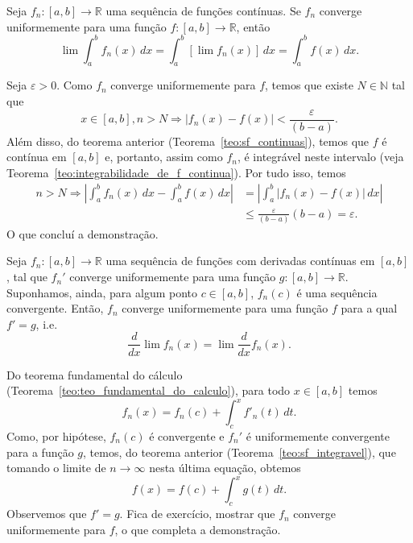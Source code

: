 \begin{teo}\label{teo:sf_integravel}
  Seja $f_n:[a, b]\to\mathbb{R}$ uma sequência de funções contínuas. Se $f_n$ converge uniformemente para uma função $f:[a, b]\to\mathbb{R}$, então
  \begin{equation}
    \lim \int_a^b f_n(x)\,dx = \int_a^b [\lim f_n(x)]\,dx = \int_a^b f(x)\,dx.
  \end{equation}
\end{teo}
\begin{dem}
  Seja $\varepsilon>0$. Como $f_n$ converge uniformemente para $f$, temos que existe $N\in\mathbb{N}$ tal que
  \begin{equation}
    x\in [a, b], n>N \Rightarrow |f_n(x) - f(x)| < \frac{\varepsilon}{(b-a)}.
  \end{equation}
Além disso, do teorema anterior (Teorema~\ref{teo:sf_continuas}), temos que $f$ é contínua em $[a, b]$ e, portanto, assim como $f_n$, é integrável neste intervalo (veja Teorema~\ref{teo:integrabilidade_de_f_continua}). Por tudo isso, temos
\begin{align}
  n>N \Rightarrow \left|\int_a^b f_n(x)\,dx - \int_a^b f(x)\,dx\right| &= \left|\int_a^b |f_n(x) - f(x)|\,dx\right|\\
                                                                       &\leq \frac{\varepsilon}{(b-a)}(b-a) = \varepsilon.
\end{align}
O que concluí a demonstração.
\end{dem}

\begin{teo}\label{teo:sf_derivaveis}
  Seja $f_n:[a, b]\to\mathbb{R}$ uma sequência de funções com derivadas contínuas em $[a, b]$, tal que $f_n'$ converge uniformemente para uma função $g:[a, b]\to\mathbb{R}$. Suponhamos, ainda, para algum ponto $c\in [a, b]$, $f_n(c)$ é uma sequência convergente. Então, $f_n$ converge uniformemente para uma função $f$ para a qual $f' = g$, i.e.
  \begin{equation}
    \frac{d}{dx}\lim f_n(x) = \lim \frac{d}{dx}f_n(x).
  \end{equation}
\end{teo}
\begin{dem}
  Do teorema fundamental do cálculo (Teorema~\ref{teo:teo_fundamental_do_calculo}), para todo $x\in [a, b]$ temos
  \begin{equation}\label{eq:sf_tfc1}
    f_n(x) = f_n(c) + \int_c^x f'_n(t)\,dt.
  \end{equation}
Como, por hipótese, $f_n(c)$ é convergente e $f_n'$ é uniformemente convergente para a função $g$, temos, do teorema anterior (Teorema~\ref{teo:sf_integravel}), que tomando o limite de $n\to \infty$ nesta última equação, obtemos
  \begin{equation}\label{eq:sf_tfc2}
    f(x) = f(c) + \int_c^x g(t)\,dt.
  \end{equation}
Observemos que $f' = g$. Fica de exercício, mostrar que $f_n$ converge uniformemente para $f$, o que completa a demonstração.
\end{dem}

